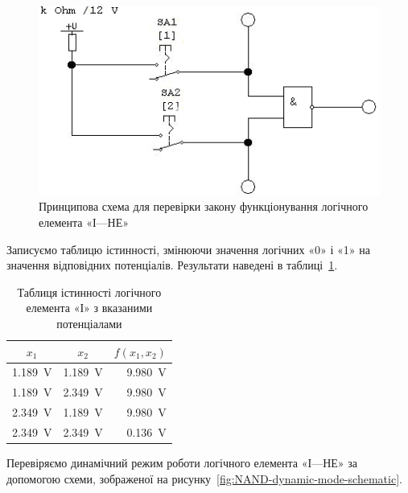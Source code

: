 \documentclass[a4paper,oneside,DIV=10,12pt]{scrartcl}
\begin{document}
			\begin{figure}[!htbp]
			\centering
				\includegraphics[]{schematics/04-01-NAND.png}
			\caption{Принципова схема для перевірки закону функціонування логічного елемента «І—НЕ»}
			\label{fig:NAND-function-law-schematic}
			\end{figure}
			
			Записуємо таблицю істинності, змінюючи значення логічних «0» і «1» на значення відповідних потенціалів. Результати наведені в таблиці~\ref{fig:NAND-truth-table-potentials}.
			
			\begin{table}[!htbp]
			\centering
				\begin{tabular}{ccr}
					\toprule
						$x_1$ & $x_2$ & $f(x_1, x_2)$\\
					\midrule
						\SI{1,189}{\volt} & \SI{1,189}{\volt} & \SI{9,980}{\volt}\\
						\SI{1,189}{\volt} & \SI{2,349}{\volt} & \SI{9,980}{\volt}\\
						\SI{2,349}{\volt} & \SI{1,189}{\volt} & \SI{9,980}{\volt}\\
						\SI{2,349}{\volt} & \SI{2,349}{\volt} & \SI{0,136}{\volt}\\
					\bottomrule
				\end{tabular}
			\caption{Таблиця істинності логічного елемента «І» з вказаними потенціалами}
			\label{fig:NAND-truth-table-potentials}
			\end{table}
			
			Перевіряємо динамічний режим роботи логічного елемента «І—НЕ» за допомогою схеми, зображеної на рисунку~\ref{fig:NAND-dynamic-mode-schematic}.
			
\end{document}
